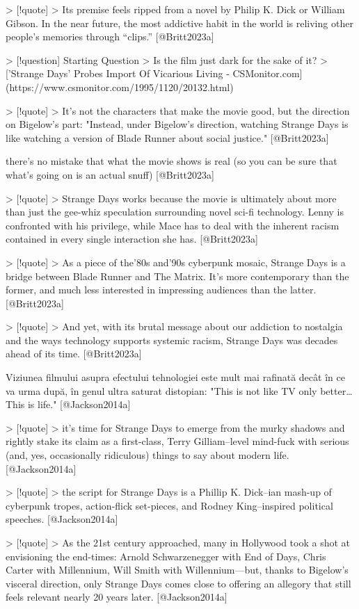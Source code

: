 \documentclass[12pt]{article}
\begin{document}
> [!quote]
> Its premise feels ripped from a novel by Philip K. Dick or William Gibson. In the near future, the most addictive habit in the world is reliving other people’s memories through “clips.” [@Britt2023a]

> [!question] Starting Question
> Is the film just dark for the sake of it?
> ['Strange Days' Probes Import Of Vicarious Living - CSMonitor.com](https://www.csmonitor.com/1995/1120/20132.html)

> [!quote]
> It's not the characters that make the movie good, but the direction on Bigelow's part: "Instead, under Bigelow’s direction, watching Strange Days is like watching a version of Blade Runner about social justice." [@Britt2023a]

there's no mistake that what the movie shows is real (so you can be sure that what's going on is an actual snuff) [@Britt2023a]

> [!quote]
> Strange Days works because the movie is ultimately about more than just the gee-whiz speculation surrounding novel sci-fi technology. Lenny is confronted with his privilege, while Mace has to deal with the inherent racism contained in every single interaction she has. [@Britt2023a]

> [!quote]
> As a piece of the’80s and’90s cyberpunk mosaic, Strange Days is a bridge between Blade Runner and The Matrix. It’s more contemporary than the former, and much less interested in impressing audiences than the latter. [@Britt2023a]

> [!quote]
> And yet, with its brutal message about our addiction to nostalgia and the ways technology supports systemic racism, Strange Days was decades ahead of its time. [@Britt2023a]

Viziunea filmului asupra efectului tehnologiei este mult mai rafinată decât în ce va urma după, în genul ultra saturat distopian: "This is not like TV only better… This is life." [@Jackson2014a]

> [!quote]
> it's time for Strange Days to emerge from the murky shadows and rightly stake its claim as a first-class, Terry Gilliam–level mind-fuck with serious (and, yes, occasionally ridiculous) things to say about modern life. [@Jackson2014a]

> [!quote]
> the script for Strange Days is a Phillip K. Dick–ian mash-up of cyberpunk tropes, action-flick set-pieces, and Rodney King–inspired political speeches. [@Jackson2014a]

> [!quote]
> As the 21st century approached, many in Hollywood took a shot at envisioning the end-times: Arnold Schwarzenegger with End of Days, Chris Carter with Millennium, Will Smith with Willennium—but, thanks to Bigelow's visceral direction, only Strange Days comes close to offering an allegory that still feels relevant nearly 20 years later. [@Jackson2014a]
\end{document}
